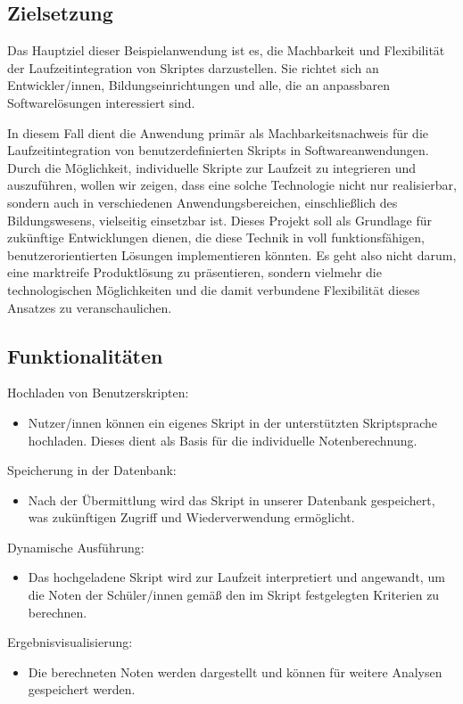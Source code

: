 \subsection*{Zielsetzung}
Das Hauptziel dieser Beispielanwendung ist es, die Machbarkeit und Flexibilität der 
Laufzeitintegration von Skriptes darzustellen. Sie richtet sich an Entwickler/innen, 
Bildungseinrichtungen und alle, die an anpassbaren Softwarelösungen interessiert sind.

In diesem Fall dient die Anwendung primär als Machbarkeitsnachweis für die Laufzeitintegration 
von benutzerdefinierten Skripts in Softwareanwendungen. Durch die Möglichkeit, individuelle 
Skripte zur Laufzeit zu integrieren und auszuführen, wollen wir zeigen, dass eine solche 
Technologie nicht nur realisierbar, sondern auch in verschiedenen Anwendungsbereichen, 
einschließlich des Bildungswesens, vielseitig einsetzbar ist. Dieses Projekt soll als 
Grundlage für zukünftige Entwicklungen dienen, die diese Technik in voll funktionsfähigen, 
benutzerorientierten Lösungen implementieren könnten. Es geht also nicht darum, 
eine marktreife Produktlösung zu präsentieren, sondern vielmehr die technologischen 
Möglichkeiten und die damit verbundene Flexibilität dieses Ansatzes zu veranschaulichen.

\newpage
\subsection*{Funktionalitäten}

Hochladen von Benutzerskripten:
\begin{itemize}
    \item Nutzer/innen können ein eigenes Skript in der unterstützten Skriptsprache hochladen. 
    Dieses dient als Basis für die individuelle Notenberechnung.
\end{itemize}

Speicherung in der Datenbank:
\begin{itemize}
    \item Nach der Übermittlung wird das Skript in unserer Datenbank gespeichert, was zukünftigen 
    Zugriff und Wiederverwendung ermöglicht.
\end{itemize} 

Dynamische Ausführung: 
\begin{itemize}
    \item Das hochgeladene Skript wird zur Laufzeit interpretiert und angewandt, 
    um die Noten der Schüler/innen gemäß den im Skript festgelegten Kriterien zu berechnen.
\end{itemize}

Ergebnisvisualisierung: 
\begin{itemize}
    \item Die berechneten Noten werden dargestellt und können 
    für weitere Analysen gespeichert werden.
\end{itemize}

